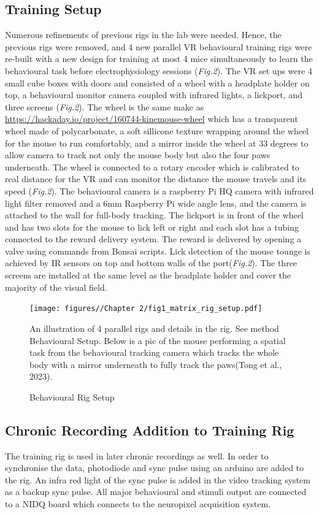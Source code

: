 \subsection{Training Setup}
Numerous refinements of previous rigs in the lab were needed. Hence, the previous rigs were removed, and 4 new parallel VR behavioural training rigs were re-built with a new design for training at most 4 mice simultaneously to learn the behavioural task before electrophysiology sessions (\textit{Fig.2}). The VR set ups were 4 small cube boxes with doors and consisted of a wheel with a headplate holder on top, a behavioural monitor camera coupled with infrared lights, a lickport, and three screens (\textit{Fig.2}). The wheel is the same make as \href{https://hackaday.io/project/160744-kinemouse-wheel}{https://hackaday.io/project/160744-kinemouse-wheel} which has a transparent wheel made of polycarbonate, a soft sillicone texture wrapping around the wheel for the mouse to run comfortably, and a mirror inside the wheel at 33 degrees to allow camera to track not only the mouse body but also the four paws underneath. The wheel is connected to a rotary encoder which is calibrated to real distance for the VR and can monitor the distance the mouse travels and its speed (\textit{Fig.2}). The behavioural camera is a raspberry Pi HQ camera with infrared light filter removed and a 6mm Raspberry Pi wide angle lens, and the camera is attached to the wall for full-body tracking. The lickport is in front of the wheel and has two slots for the mouse to lick left or right and each slot has a tubing connected to the reward delivery system. The reward is delivered by opening a valve using commands from Bonsai scripts. Lick detection of the mouse tounge is achieved by IR sensors on top and bottom walls of the port(\textit{Fig.2}). The three screens are installed at the same level as the headplate holder and cover the majority of the visual field.
\begin{figure}
    \centering
    \texttt{[image: figures//Chapter 2/fig1\_matrix\_rig\_setup.pdf]}
    \caption{Behavioural Rig Setup}
An illustration of 4 parallel rigs and details in the rig. See method Behavioural Setup. Below is a pic of the mouse performing a spatial task from the behavioural tracking camera which tracks the whole body with a mirror underneath to fully track the paws(Tong et al., 2023).  
    \label{fig:placeholder}
\end{figure}


\subsection{Chronic Recording Addition to Training Rig}
The training rig is used in later chronic recordings as well. In order to synchronise the data, photodiode and sync pulse using an arduino are added to the rig. An infra red light of the sync pulse is added in the video tracking system as a backup sync pulse. All major behavioural and stimuli output are connected to a NIDQ board which connects to the neuropixel acquisition system.

